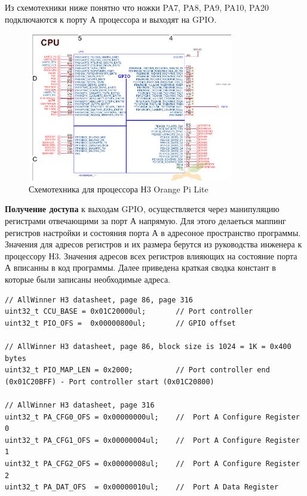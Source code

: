 Из схемотехники ниже понятно что ножки PA7, PA8, PA9, PA10, PA20 подключаются к порту А процессора и выходят на GPIO.

\begin{figure}[h!]
    \centering
    \includegraphics[width=0.8\textwidth]{2017-05-09_at_17:08:43_screenshot.png}
    \caption{Схемотехника для процессора Н3 Orange Pi Lite}
\end{figure}

\newpage

\textbf{Получение доступа} к выходам GPIO, осуществляется через манипуляцию регистрами отвечающими за порт А напрямую. Для этого делаеться маппинг регистров настройки и состояния порта А в адресоное пространство программы. Значения для адресов регистров и их размера берутся из руководства инженера к процессору Н3.
Значения адресов всех регистров влияющих на состояние порта А вписанны в код программы. Далее приведена краткая сводка констант в которые были записаны необходимые адреса.

\begin{small}
\begin{verbatim}
// AllWinner H3 datasheet, page 86, page 316
uint32_t CCU_BASE = 0x01C20000ul;       // Port controller
uint32_t PIO_OFS =  0x00000800ul;       // GPIO offset

// AllWinner H3 datasheet, page 86, block size is 1024 = 1K = 0x400 bytes 
uint32_t PIO_MAP_LEN = 0x2000;          // Port controller end (0x01C20BFF) - Port controller start (0x01C20800)

// AllWinner H3 datasheet, page 316
uint32_t PA_CFG0_OFS = 0x00000000ul;    //  Port A Configure Register 0
uint32_t PA_CFG1_OFS = 0x00000004ul;    //  Port A Configure Register 1
uint32_t PA_CFG2_OFS = 0x00000008ul;    //  Port A Configure Register 2
uint32_t PA_DAT_OFS  = 0x00000010ul;    //  Port A Data Register
\end{verbatim}
\end{small}


